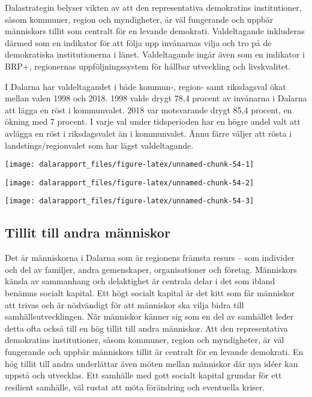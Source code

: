 \documentclass[
]{article}
\begin{document}
Dalastrategin belyser vikten av att den representativa demokratins
institutioner, såsom kommuner, region och myndigheter, är väl fungerande
och uppbär människors tillit som centralt för en levande demokrati.
Valdeltagande inkluderas därmed som en indikator för att följa upp
invånarnas vilja och tro på de demokratiska institutionerna i länet.
Valdeltagande ingår även som en indikator i BRP+, regionernas
uppföljningssystem för hållbar utveckling och livskvalitet.

I Dalarna har valdeltagandet i både kommun-, region- samt riksdagsval
ökat mellan valen 1998 och 2018. 1998 valde drygt 78,4 procent av
invånarna i Dalarna att lägga en röst i kommunvalet. 2018 var
motsvarande drygt 85,4 procent, en ökning med 7 procent. I varje val
under tidsperioden har en högre andel valt att avlägga en röst i
riksdagsvalet än i kommunvalet. Ännu färre väljer att rösta i
landstings/regionvalet som har lägst valdeltagande.

\begin{center}\texttt{[image: dalarapport\_files/figure-latex/unnamed-chunk-54-1]} \end{center}

\begin{center}\texttt{[image: dalarapport\_files/figure-latex/unnamed-chunk-54-2]} \end{center}

\begin{center}\texttt{[image: dalarapport\_files/figure-latex/unnamed-chunk-54-3]} \end{center}

\hypertarget{tillit-till-andra-muxe4nniskor}{%
\subsection{Tillit till andra
människor}\label{tillit-till-andra-muxe4nniskor}}

Det är människorna i Dalarna som är regionens främsta resurs -- som
individer och del av familjer, andra gemenskaper, organisationer och
företag. Människors känsla av sammanhang och delaktighet är centrala
delar i det som ibland benämns socialt kapital. Ett högt socialt kapital
är det kitt som får människor att trivas och är nödvändigt för att
människor ska vilja bidra till samhällsutvecklingen. När människor
känner sig som en del av samhället leder detta ofta också till en hög
tillit till andra människor. Att den representativa demokratins
institutioner, såsom kommuner, region och myndigheter, är väl fungerande
och uppbär människors tillit är centralt för en levande demokrati. En
hög tillit till andra underlättar även möten mellan människor där nya
idéer kan uppstå och utvecklas. Ett samhälle med gott socialt kapital
grundar för ett resilient samhälle, väl rustat att möta förändring och
eventuella kriser.
\end{document}
